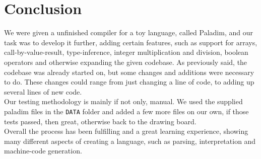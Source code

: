 \section{Conclusion}
We were given a unfinished compiler for a toy language, called \textsf{Paladim},
and our task was to develop it further, adding certain features, such as support
for arrays, call-by-value-result, type-inference, integer multiplication and
division, boolean operators and otherwise expanding the given codebase. As
previously said, the codebase was already started on, but some changes and
additions were necessary to do.  These changes could range from just changing a
line of code, to adding up several lines of new code.\\
Our testing methodology is mainly if not only, manual. We used the supplied
paladim files in the \verb|DATA| folder and added a few more files on our own,
if those tests passed, then great, otherwise back to the drawing board.\\
Overall the process has been fulfilling and a great learning experience, showing
many different aspects of creating a language, such as parsing, interpretation
and machine-code generation.\\

